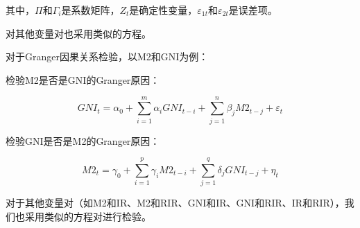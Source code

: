 其中，$\Pi$和$\Gamma_i$是系数矩阵，$Z_t$是确定性变量，$\varepsilon_{1t}$和$\varepsilon_{2t}$是误差项。

对其他变量对也采用类似的方程。


对于Granger因果关系检验，以M2和GNI为例：

检验M2是否是GNI的Granger原因：

\begin{equation}
	GNI_t = \alpha_0 + \sum_{i=1}^{m} \alpha_i GNI_{t-i} + \sum_{j=1}^{n} \beta_j M2_{t-j} + \varepsilon_t
\end{equation}

检验GNI是否是M2的Granger原因：

\begin{equation}
	M2_t = \gamma_0 + \sum_{i=1}^{p} \gamma_i M2_{t-i} + \sum_{j=1}^{q} \delta_j GNI_{t-j} + \eta_t
\end{equation}

对于其他变量对（如M2和IR、M2和RIR、GNI和IR、GNI和RIR、IR和RIR），我们也采用类似的方程对进行检验。









